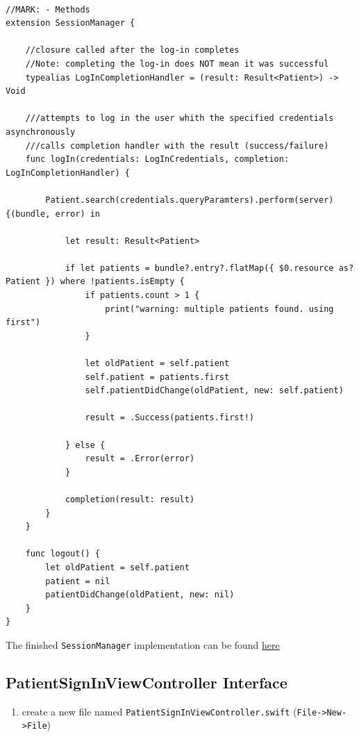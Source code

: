 \documentclass{article}
\begin{document}
\begin{verbatim}

//MARK: - Methods
extension SessionManager {

    //closure called after the log-in completes
    //Note: completing the log-in does NOT mean it was successful
    typealias LogInCompletionHandler = (result: Result<Patient>) -> Void

    ///attempts to log in the user whith the specified credentials asynchronously
    ///calls completion handler with the result (success/failure)
    func logIn(credentials: LogInCredentials, completion: LogInCompletionHandler) {

        Patient.search(credentials.queryParamters).perform(server) {(bundle, error) in

            let result: Result<Patient>

            if let patients = bundle?.entry?.flatMap({ $0.resource as? Patient }) where !patients.isEmpty {
                if patients.count > 1 {
                    print("warning: multiple patients found. using first")
                }

                let oldPatient = self.patient
                self.patient = patients.first
                self.patientDidChange(oldPatient, new: self.patient)

                result = .Success(patients.first!)

            } else {
                result = .Error(error)
            }

            completion(result: result)
        }
    }

    func logout() {
        let oldPatient = self.patient
        patient = nil
        patientDidChange(oldPatient, new: nil)
    }
}
\end{verbatim}

The finished \texttt{SessionManager} implementation can be found
\href{resources/step5/SessionManager.swift}{here}

\subsection{PatientSignInViewController
Interface}\label{step5-1}

\begin{enumerate}
\def\labelenumi{\arabic{enumi}.}

\item
  create a new file named \texttt{PatientSignInViewController.swift}
  (\texttt{File-\textgreater{}New-\textgreater{}File})
\end{enumerate}
\end{document}
